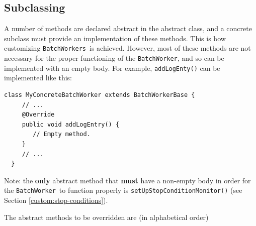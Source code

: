 \documentclass{article}
\newcommand{\BW}{{\tt BatchWorker}}
\newcommand{\BWs}{{\tt BatchWorkers}}
\begin{document}
\subsection{Subclassing }
\label{custom:subclass}

A number of methods are declared abstract in the abstract  class, and a concrete subclass must provide an implementation of these methods. This is how customizing \BWs\ is achieved. However, most of these methods are not necessary for the proper functioning of the \BW, and so can be implemented with an empty body. For example, {\tt addLogEnty()} can be implemented like this:

\begin{lstlisting}[]
  class MyConcreteBatchWorker extends BatchWorkerBase {
     // ...
     @Override
     public void addLogEntry() {
        // Empty method.
     }
     // ...
  }
\end{lstlisting}

\begin{sideblock}
Note: the \textbf{only}  abstract method that \textbf{must} have a non-empty body in order for the \BW\ to function properly is {\tt setUpStopConditionMonitor()} (see Section \ref{custom:stop-conditions}). 
\end{sideblock}

The abstract methods to be overridden are (in alphabetical order)
\end{document}
